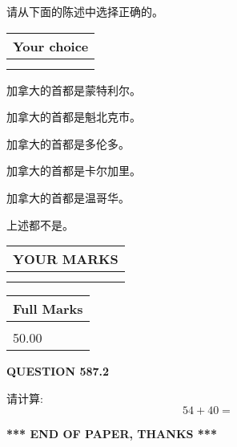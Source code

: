 \documentclass{ctexart}
\begin{document}
  
请从下面的陈述中选择正确的。
  
  
\noindent\hspace{3.0in} \begin{tabular}{|l|}
\hline
Your choice \\
\hline
 \\ 
 \\ 
\hline
\end{tabular}
  
  
 
 
加拿大的首都是蒙特利尔。
 
 
加拿大的首都是魁北克市。
 
 
加拿大的首都是多伦多。
 
 
加拿大的首都是卡尔加里。
 
 
加拿大的首都是温哥华。
 
 
 上述都不是。
 
 
  
\vspace{0.2in}
  
\noindent\begin{tabular}{|l|}
\hline
 YOUR MARKS  \\
\hline
 \\ 
 \\ 
\hline
\end{tabular}
\hspace{0.05in} \begin{tabular}{|l|}
\hline
 Full Marks  \\
\hline
 \\ 
50.00 \\
\hline
\end{tabular}
{\textbf{\Large{QUESTION
587.2 
}}}
  
  
 
请计算:
\begin{equation}
54 +  %
40 = \nonumber
\end{equation}
 

 

 
   
   
 \vspace{0.2in}
 
   
   
   
   
\vspace{1.0in} 
{\textbf{\large{ *** END OF PAPER, THANKS *** }}} 
   
\end{document}
